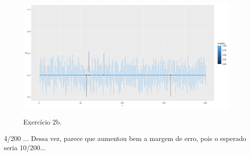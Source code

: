\documentclass{article}
\begin{document}
    \begin{figure}[h]
    	\caption{Exercício 2b.}
    	\centering %
    	\includegraphics[width=16cm]{2b.png} %
    	\label{figura:ex3p1}
    \end{figure}
    
    4/200 ... Dessa vez, parece que aumentou bem a margem de erro, pois o esperado seria 10/200...
    
	
	
\end{document}
